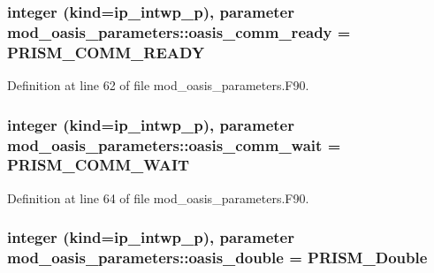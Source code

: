 \hypertarget{classmod__oasis__parameters_a8484e196ef7469adbeaef850787d7502}{
\subsubsection[{oasis\+\_\+comm\+\_\+ready}]{\setlength{\rightskip}{0pt plus 5cm}integer (kind=ip\+\_\+intwp\+\_\+p), parameter mod\+\_\+oasis\+\_\+parameters\+::oasis\+\_\+comm\+\_\+ready = P\+R\+I\+S\+M\+\_\+\+C\+O\+M\+M\+\_\+\+R\+E\+A\+D\+Y}}\label{classmod__oasis__parameters_a8484e196ef7469adbeaef850787d7502}


Definition at line 62 of file mod\+\_\+oasis\+\_\+parameters.\+F90.

\hypertarget{classmod__oasis__parameters_a9df795bd9123857642aae31661b6c13a}{
\subsubsection[{oasis\+\_\+comm\+\_\+wait}]{\setlength{\rightskip}{0pt plus 5cm}integer (kind=ip\+\_\+intwp\+\_\+p), parameter mod\+\_\+oasis\+\_\+parameters\+::oasis\+\_\+comm\+\_\+wait = P\+R\+I\+S\+M\+\_\+\+C\+O\+M\+M\+\_\+\+W\+A\+I\+T}}\label{classmod__oasis__parameters_a9df795bd9123857642aae31661b6c13a}


Definition at line 64 of file mod\+\_\+oasis\+\_\+parameters.\+F90.

\hypertarget{classmod__oasis__parameters_a1071adbbf4c378907b4ff69dd53d0d7e}{
\subsubsection[{oasis\+\_\+double}]{\setlength{\rightskip}{0pt plus 5cm}integer (kind=ip\+\_\+intwp\+\_\+p), parameter mod\+\_\+oasis\+\_\+parameters\+::oasis\+\_\+double = P\+R\+I\+S\+M\+\_\+\+Double}}\label{classmod__oasis__parameters_a1071adbbf4c378907b4ff69dd53d0d7e}


